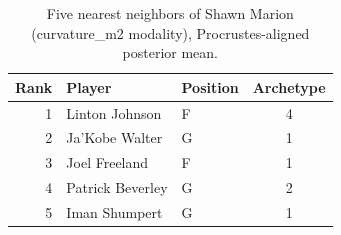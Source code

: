 \begin{table}[htbp]
  \centering\small
  \begin{tabular}{rllc}
    \toprule
    Rank & Player & Position & Archetype \\
    \midrule
    1 & Linton Johnson & F & 4 \\
    2 & Ja'Kobe Walter & G & 1 \\
    3 & Joel Freeland & F & 1 \\
    4 & Patrick Beverley & G & 2 \\
    5 & Iman Shumpert & G & 1 \\
    \bottomrule
  \end{tabular}
  \caption{Five nearest neighbors of Shawn Marion (curvature_m2 modality), Procrustes-aligned posterior mean.}
  \label{tab:Shawn_Marion_neighbors_curvature_m2}
\end{table}

